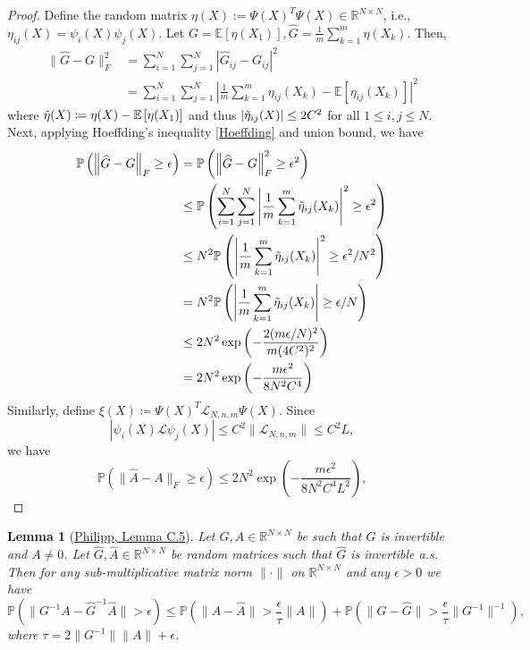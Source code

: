 \documentclass{article}[11]
\newtheorem{lemma}[theorem]{Lemma}
\begin{document}
\begin{proof}
	Define the random matrix $\eta(X):= \Psi(X)^T \Psi(X) \in \mathbb{R}^{N \times N}$, i.e., $\eta_{ij}(X) = \psi_i(X)\psi_j(X)$. Let $G = \mathbb{E}[\eta(X_1)], \widehat{G} = \frac{1}{m}\sum_{k=1}^{m} \eta(X_k)$. Then, 
	\begin{align*}
		\| \widehat{G} - G \|_F^2 &= \sum_{i=1}^{N}\sum_{j=1}^{N} \left| \widehat{G}_{ij} - G_{ij} \right|^2 \\
		&= \sum_{i=1}^{N}\sum_{j=1}^{N} \left| \frac{1}{m}\sum_{k=1}^m \eta_{ij}(X_k) - \mathbb{E}\left[\eta_{ij}(X_k)\right] \right|^2
	\end{align*}
	where $\Tilde{\eta}(X) \coloneqq \eta(X) - \mathbb{E}\left[\eta(X_1)\right]$ and thus $\left| \Tilde{\eta}_{ij}(X) \right| \leq 2C^2$ for all $1 \leq i,j \leq N$.
	Next, applying Hoeffding's inequality \eqref{Hoeffding} and union bound, we have
	\begin{align*}
		\mathbb{P} \left( \left\| \widehat{G} - G \right\|_F \geq \epsilon \right) &= \mathbb{P} \left( \left\| \widehat{G} - G \right\|_F^2 \geq \epsilon^2 \right) \\
		&\leq \mathbb{P} \left( \sum_{i=1}^{N}\sum_{j=1}^{N} \left| \frac{1}{m} \sum_{k=1}^m \Tilde{\eta}_{ij}(X_k) \right|^2 \geq \epsilon^2 \right) \\
		&\leq N^2 \mathbb{P} \left( \left| \frac{1}{m} \sum_{k=1}^m \Tilde{\eta}_{ij}(X_k) \right|^2 \geq \epsilon^2/N^2 \right) \\
		&= N^2 \mathbb{P} \left( \left| \frac{1}{m} \sum_{k=1}^m \Tilde{\eta}_{ij}(X_k) \right| \geq \epsilon/N \right) \\
		&\leq 2N^2 \exp \left( -\frac{2(m\epsilon/N)^2}{m(4C^2)^2} \right) \\
		&= 2N^2 \exp \left( -\frac{m \epsilon^2}{8 N^2 C^4} \right)
	\end{align*}
	Similarly, define $\xi(X) \coloneqq \Psi(X)^T \mathcal{L}_{N,n,m}\Psi(X)$. Since 
	\[ |\psi_i(X) \mathcal{L} \psi_j(X)| \leq C^2\|\mathcal{L}_{N,n,m}\| \leq C^2 L, \]
	we have
	\[ \mathbb{P} \left( \| \widehat{A} - A \|_F \geq \epsilon \right) \leq 2 N^2 \exp \left( -\frac{m\epsilon^2}{8 N^2 C^4 L^2} \right), \]
\end{proof}


\begin{lemma}[\href{https://arxiv.org/pdf/2402.02494}{Philipp, Lemma C.5}]\label{Philipp}
	Let $G, A \in \mathbb{R}^{N \times N}$ be such that $G$ is invertible and $A \neq 0$. Let $\widehat{G}, \widehat{A} \in \mathbb{R}^{N \times N}$ be random matrices such that $\widehat{G}$ is invertible a.s. Then for any sub-multiplicative matrix norm $\|\cdot\|$ on $\mathbb{R}^{N \times N}$ and any $\epsilon > 0$ we have
	\[
	\mathbb{P}\left(\|G^{-1}A - \widehat{G}^{-1}\widehat{A}\| > \epsilon \right) \leq \mathbb{P}\left(\|A - \widehat{A}\| > \frac{\epsilon}{\tau} \|A\|\right) + \mathbb{P}\left(\|G - \widehat{G}\| > \frac{\epsilon}{\tau} \|G^{-1}\|^{-1}\right),
	\]
	where $\tau = 2\|G^{-1}\|\|A\| + \epsilon$.
\end{lemma}
\end{document}
